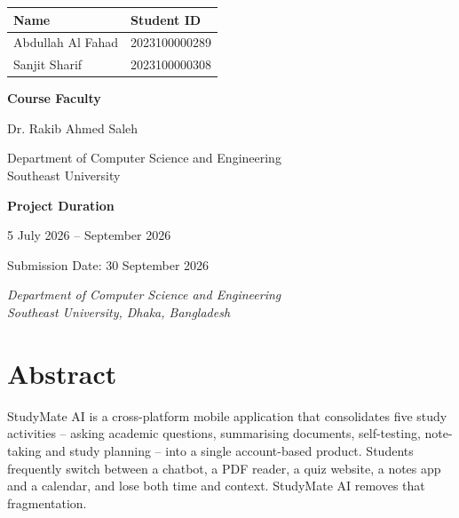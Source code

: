 \documentclass[12pt,a4paper,oneside]{report}
\begin{document}
\begin{titlepage}
\begin{tabular}{@{}ll@{}}
\toprule
\textbf{Name} & \textbf{Student ID} \\
\midrule
Abdullah Al Fahad & 2023100000289 \\
Sanjit Sharif     & 2023100000308 \\
\bottomrule
\end{tabular}

\vspace{18pt}
{\normalsize\bfseries Course Faculty\par}
\vspace{4pt}
{\large Dr. Rakib Ahmed Saleh\par}
\vspace{2pt}
{\small Department of Computer Science and Engineering\\ Southeast University\par}

\vfill
{\normalsize\bfseries Project Duration\par}
\vspace{2pt}
{\small 5 July 2026 \quad-- September 2026\par}
\vspace{12pt}
{\small Submission Date: 30 September 2026\par}
\vspace{10pt}
{\footnotesize\itshape Department of Computer Science and Engineering\\
Southeast University, Dhaka, Bangladesh\par}
\end{titlepage}

\chapter*{Abstract}
\pagestyle{fancy}

StudyMate AI is a cross-platform mobile application that consolidates five study
activities -- asking academic questions, summarising documents, self-testing,
note-taking and study planning -- into a single account-based product. Students
frequently switch between a chatbot, a PDF reader, a quiz website, a notes app and
a calendar, and lose both time and context. StudyMate AI removes that fragmentation.
\end{document}
